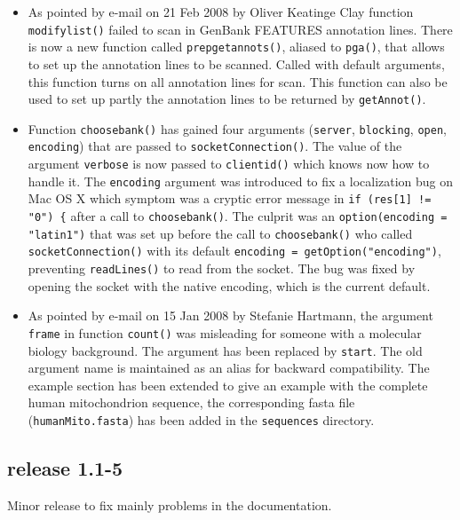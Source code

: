 \documentclass{article}
\begin{document}
\begin{itemize}
\item As pointed by e-mail on 21 Feb 2008 by Oliver Keatinge Clay
  function \texttt{modifylist()} failed to scan in GenBank FEATURES
  annotation lines. There is now a new function called
  \texttt{prepgetannots()}, aliased to \texttt{pga()}, that allows
  to set up the annotation lines to be scanned. Called with default
  arguments, this function turns on all annotation lines for scan.
  This function can also be used to set up partly the annotation lines
  to be returned by \texttt{getAnnot()}.

\item Function \texttt{choosebank()} has gained four arguments
  (\texttt{server}, \texttt{blocking}, \texttt{open}, \texttt{encoding})
  that are passed to \texttt{socketConnection()}. The value of
  the argument \texttt{verbose} is now passed to \texttt{clientid()}
  which knows now how to handle it. The \texttt{encoding} argument
  was introduced to fix a localization bug on Mac OS X which symptom was a
  cryptic error message in \texttt{if (res[1] != "0") \{} after
  a call to \texttt{choosebank()}. The culprit was an
  \texttt{option(encoding = "latin1")} that was set up before
  the call to \texttt{choosebank()} who called \texttt{socketConnection()}
  with its default \texttt{encoding = getOption("encoding")},
  preventing \texttt{readLines()} to read from the socket.
  The bug was fixed by opening the socket with the native encoding,
  which is the current default.

\item As pointed by e-mail on 15 Jan 2008 by Stefanie Hartmann, the
  argument \texttt{frame} in function \texttt{count()} was misleading
  for someone with a molecular biology background. The argument has
  been replaced by \texttt{start}. The old argument name is maintained
  as an alias for backward compatibility. The example section has 
  been extended to
  give an example with the complete human mitochondrion sequence, the
  corresponding fasta file (\texttt{humanMito.fasta}) has been added in the 
  \texttt{sequences} directory.
\end{itemize}

\subsection*{release 1.1-5}

Minor release to fix mainly problems in the documentation.
\end{document}
